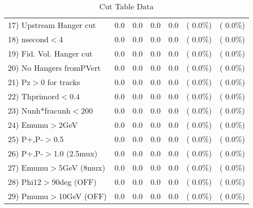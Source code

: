 \begin{table}[h!]
\begin{tabular}{||l||r|r|r|r|r|r||}
 17) Upstream Hanger cut  &          0.0 &          0.0 &          0.0 &          0.0 & (  0.0\%) & (  0.0\%) \\
 18) nsecond$<$4          &          0.0 &          0.0 &          0.0 &          0.0 & (  0.0\%) & (  0.0\%) \\
 19) Fid. Vol. Hanger cut &          0.0 &          0.0 &          0.0 &          0.0 & (  0.0\%) & (  0.0\%) \\
 20) No Hangers fromPVert &          0.0 &          0.0 &          0.0 &          0.0 & (  0.0\%) & (  0.0\%) \\
 21) Pz$>$0 for tracks    &          0.0 &          0.0 &          0.0 &          0.0 & (  0.0\%) & (  0.0\%) \\
 22) Thprimord$<$0.4      &          0.0 &          0.0 &          0.0 &          0.0 & (  0.0\%) & (  0.0\%) \\
 23) Nunh*fracunh$<$200   &          0.0 &          0.0 &          0.0 &          0.0 & (  0.0\%) & (  0.0\%) \\
 24) Emumu$>$2GeV         &          0.0 &          0.0 &          0.0 &          0.0 & (  0.0\%) & (  0.0\%) \\
 25) P+,P-$>$0.5          &          0.0 &          0.0 &          0.0 &          0.0 & (  0.0\%) & (  0.0\%) \\
 26) P+,P-$>$1.0 (2.5mux) &          0.0 &          0.0 &          0.0 &          0.0 & (  0.0\%) & (  0.0\%) \\
 27) Emumu$>$5GeV  (8mux) &          0.0 &          0.0 &          0.0 &          0.0 & (  0.0\%) & (  0.0\%) \\
 28) Phi12$>$90deg  (OFF) &          0.0 &          0.0 &          0.0 &          0.0 & (  0.0\%) & (  0.0\%) \\
 29) Pmumu$>$10GeV  (OFF) &          0.0 &          0.0 &          0.0 &          0.0 & (  0.0\%) & (  0.0\%) \\
 \hline
 \hline
 \end{tabular}
 \caption{Cut Table  Data     }
 \label{tab-cutcohjpsi-mumu_data}
 \end{table}
